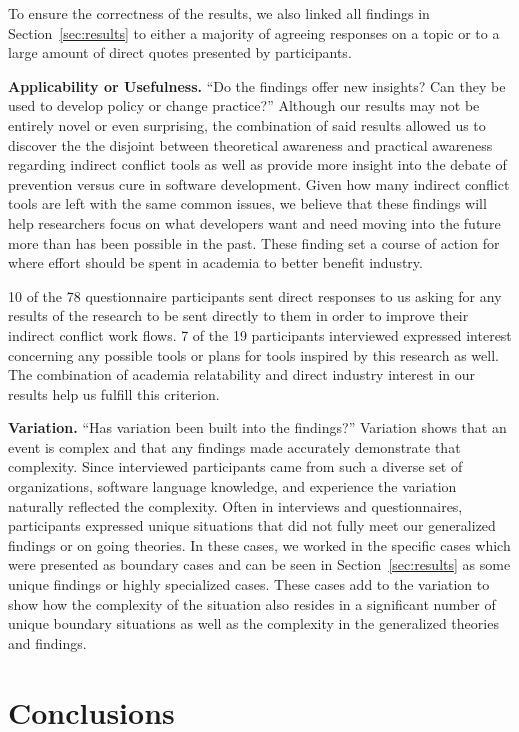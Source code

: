 \documentclass[conference]{IEEEtran}
\begin{document}
To ensure the correctness of the results, we also linked all findings in Section~\ref{sec:results} to either a majority of agreeing
responses on a topic or to a large amount of direct quotes presented by participants.

{\bfseries Applicability or Usefulness.} ``Do the findings offer new insights? Can they be used to develop policy or change practice?''
Although our results may not be entirely novel or even surprising, the combination of said results allowed us to discover the
the disjoint between theoretical awareness and practical awareness regarding indirect conflict tools as well as provide more
insight into the debate of prevention versus cure in software development. Given how many indirect conflict tools are left with the same common
issues, we believe that these findings will help researchers focus on what developers want and need moving into the future more than has
been possible in the past. These finding set a course of action for where effort should be spent in academia to better benefit industry.

10 of the 78 questionnaire participants sent direct responses to us asking for any results of the research to be sent directly to
them in order to improve their indirect conflict work flows. 7 of the 19 participants interviewed expressed interest concerning any possible
tools or plans for tools inspired by this research as well. The combination of academia relatability and direct industry interest
in our results help us fulfill this criterion.

{\bfseries Variation.} ``Has variation been built into the findings?'' Variation shows that an event is complex and that any findings
made accurately demonstrate that complexity. Since interviewed participants came from such a diverse set of organizations,
software language knowledge, and experience the variation naturally reflected the complexity. Often in interviews and questionnaires, participants
expressed unique situations that did not fully meet our generalized findings or on going theories. In these cases, we worked in the specific
cases which were presented as boundary cases and can be seen in Section~\ref{sec:results} as some unique findings or highly
specialized cases. These cases add to the variation
to show how the complexity of the situation also resides in a significant number of unique boundary situations as well as the complexity
in the generalized theories and findings.

\section{Conclusions}
\label{sec:conc}
\end{document}
